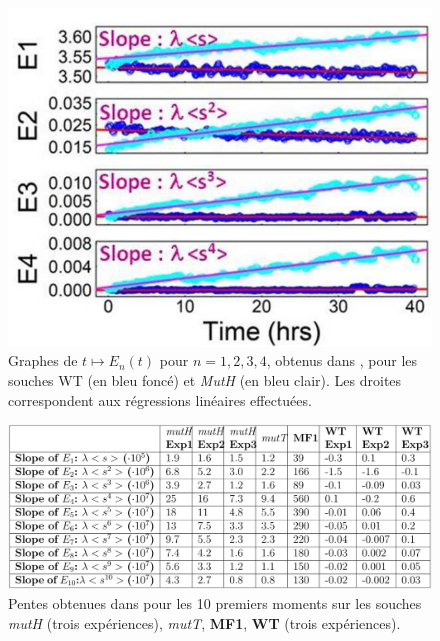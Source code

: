 \documentclass[12pt]{article}
\begin{document}
\begin{figure}[h]
  \begin{center}
    \includegraphics[scale=0.3]{img/supmat_lines.png}
  \end{center}
  \caption{\label{lines}Graphes de $t\mapsto E_n(t)$ pour $n=1,2,3,4$, obtenus dans \cite{rob}, pour les souches WT (en bleu foncé) et \emph{MutH} (en bleu clair). Les droites correspondent aux régressions linéaires effectuées.}
\end{figure}

\begin{figure}[h]
  \begin{center}
    \includegraphics[scale=0.3]{img/supmat_slopes.png}
  \end{center}
  \caption{\label{slopes}Pentes obtenues dans \cite{rob} pour les 10 premiers moments sur les souches \emph{mutH} (trois expériences), \emph{mutT}, \textbf{MF1}, \textbf{WT} (trois expériences).}
\end{figure}
\end{document}

